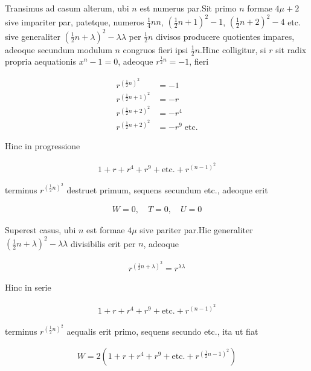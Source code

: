 %

Transimus ad casum alterum, ubi $n$ est numerus par.\quad Sit primo $n$ formae $4\mu+2$ sive impariter par, patetque, numeros $\frac14nn$, $(\frac12n+1)^2-1$, $(\frac12n+2)^2-4$ etc. sive generaliter $(\frac12n+\lambda)^2-\lambda\lambda$ per $\frac12n$ divisos producere quotientes impares, adeoque secundum modulum $n$ congruos fieri ipsi $\frac12n$.\quad Hinc colligitur, si $r$ sit radix propria aequationis $x^n-1=0$, adeoque $r^{\frac12n}=-1$, fieri

\[
\begin{aligned}
r^{(\frac12n)^2}&=-1\\
r^{(\frac12n+1)^2}&=-r\\
r^{(\frac12n+2)^2}&=-r^4\\
r^{(\frac12n+2)^2}&=-r^9\;\text{etc.}
\end{aligned}
\]

Hinc in progressione

\[
\begin{aligned}
1+r+r^4+r^9+\text{etc.}+r^{(n-1)^2}
\end{aligned}
\]

terminus $r^{(\frac12n)^2}$ destruet primum, sequens secundum etc., adeoque erit

\[
\begin{aligned}
W=0,\quad T=0,\quad U=0
\end{aligned}
\]


Superest casus, ubi $n$ est formae $4\mu$ sive pariter par.\quad Hic generaliter $(\frac12n+\lambda)^2-\lambda\lambda$ divisibilis erit per $n$, adeoque

\[
\begin{aligned}
r^{(\frac12n+\lambda)^2}=r^{\lambda\lambda}
\end{aligned}
\]

Hinc in serie

\[
\begin{aligned}
1+r+r^4+r^9+\text{etc.}+r^{(n-1)^2}
\end{aligned}
\]

terminus $r^{(\frac12n)^2}$ aequalis erit primo, sequens secundo etc., ita ut fiat

\[
\begin{aligned}
W=2(1+r+r^4+r^9+\text{etc.}+r^{(\frac12n-1)^2})
\end{aligned}
\]

